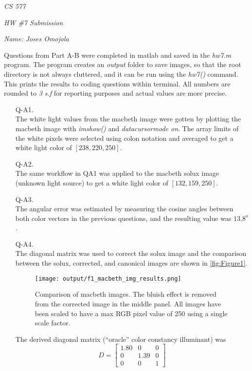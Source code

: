 \documentclass[12pt]{report}
\begin{document}
\centerline{\it CS 577}
\centerline{\it HW \#7 Submission}
\centerline{\it Name: Joses Omojola}

Questions from Part A-B were completed in matlab and saved in the \emph{hw7.m} program. The program creates an \emph{output} folder to save images, so that the 
root directory is not always cluttered, and it can be run using the \textit{hw7()} command. This prints the results to coding questions within terminal. All numbers 
are rounded to \emph{3 s.f} for reporting purposes and actual values are more precise.

\begin{enumerate}

    \item[Q-A1.]
    \ \\
    The white light values from the macbeth image were gotten by plotting the macbeth image with \emph{imshow()} and \emph{datacursormode on}. The array limits 
    of the white pixels were selected using colon notation and averaged to get a white light color of $[238,220,250]$.
    
    \item[Q-A2.]
    \ \\
    The same workflow in QA1 was applied to the macbeth solux image (unknown light source) to get a white light color of $[132,159,250]$.
    
    \item[Q-A3.]
    \ \\
    The angular error was estimated by measuring the cosine angles between both color vectors in the previous questions, and the resulting value was $13.8^o$.
    
    \item[Q-A4.]
    \ \\
    The diagonal matrix was used to correct the solux image and the comparison between the solux, corrected, and canonical images are shown in \autoref{fig:Figure1}.

    \begin{figure}[H]
        \centering
        \texttt{[image: output/f1\_macbeth\_img\_results.png]}
        \caption{Comparison of macbeth images. The bluish effect is removed from the corrected image in the middle panel. All images have been scaled to have a 
        max RGB pixel value of 250 using a single scale factor.}
        \label{fig:Figure1}
    \end{figure}

    \FloatBarrier 

    The derived diagonal matrix (“oracle” color constancy illuminant) was 
    $$
    D = 
    \begin{bmatrix}
    1.80 & 0 & 0 \\
    0 & 1.39 & 0 \\
    0 & 0 & 1
    \end{bmatrix}
    $$


\end{enumerate}
\end{document}
